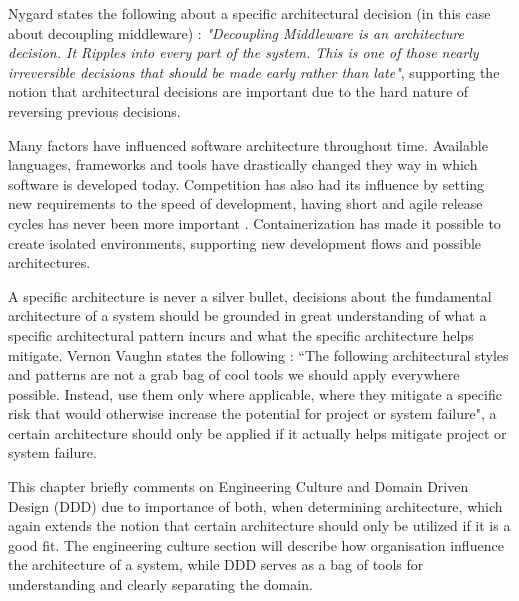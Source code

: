 Nygard states the following about a specific architectural decision (in this case about decoupling middleware) \cite[p.~116]{nygard2007release}: \textit{"Decoupling Middleware is an architecture decision. It Ripples into every part of the system. This is one of those nearly irreversible decisions that should be made early rather than late"}, supporting the notion that architectural decisions are important due to the hard nature of reversing previous decisions.

Many factors have influenced software architecture throughout time. Available languages, frameworks and tools have drastically changed they way in which software is developed today. Competition has also had its influence by setting new requirements to the speed of development, having short and agile release cycles has never been more important \cite[t.~06:55]{george2016it}. Containerization has made it possible to create isolated environments, supporting new development flows and possible architectures.

A specific architecture is never a silver bullet, decisions about the fundamental architecture of a system should be grounded in great understanding of what a specific architectural pattern incurs and what the specific architecture helps mitigate. Vernon Vaughn states the following \cite[p.~113]{vernon2013implementing}: “The following architectural styles and patterns are not a grab bag of cool tools we should apply everywhere possible. Instead, use them only where applicable, where they mitigate a specific risk that would otherwise increase the potential for project or system failure", a certain architecture should only be applied if it actually helps mitigate project or system failure.

This chapter briefly comments on Engineering Culture and Domain Driven Design (DDD) due to importance of both, when determining architecture, which again extends the notion that certain architecture should only be utilized if it is a good fit. The engineering culture section will describe how organisation influence the architecture of a system, while DDD serves as a bag of tools for understanding and clearly separating the domain.

